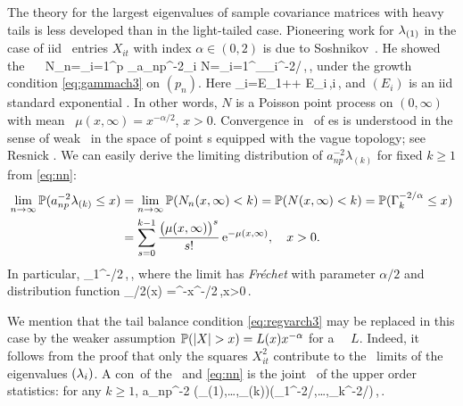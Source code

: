 The theory for the largest eigenvalues of sample covariance matrices with heavy tails is less developed than in the light-tailed case.
Pioneering work for $\lambda_{(1)}$ in the case of iid \regvary\ entries $X_{it}$ with index $\alpha\in (0,2)$
is due to Soshnikov~\cite{soshnikov:2004,soshnikov:2006}. He showed the \pp\ \con\
\beam\label{eq:nn}
N_n=\sum_{i=1}^p \vep_{a_{np}^{-2}\la_i} \std N=\sum_{i=1}^\infty \vep_{\Gamma_i^{-2/\alpha}}\,,\qquad \nto\,,
\eeam
under the growth condition \eqref{eq:gammach3} on $(p_n)$.
Here
\beam\label{eq:Gamma}
\Gamma_i=E_1+\cdots + E_i\,,\qquad i\,,
\eeam
and $(E_i)$ is an iid standard exponential \seq . In other words, $N$ is a Poisson point process on $(0,\infty)$ with mean \ms\
$\mu(x,\infty)= x^{-\alpha/2}$, $x>0$. Convergence in \ds\ of \pp es is understood in the sense of weak \con\
in the space of point \ms s equipped with the vague topology; see Resnick \cite{resnick:2007,resnick:1987}.
We can easily derive the limiting distribution of $a_{np}^{-2} \lambda_{(k)}$ for fixed $k\ge 1$ from \eqref{eq:nn}:
\begin{equation*}
\begin{split}
\lim_{n \to \infty}\mathbb{P}(a_{np}^{-2} \lambda_{(k)}\le x)&= \lim_{n \to \infty}\mathbb{P}(N_n(x,\infty)<k)
=  \mathbb{P}(N(x,\infty)<k) =\mathbb{P}(\Gamma_k^{-2/\alpha}\le x)\\ &= \sum_{s=0}^{k-1} \frac{\big(\mu(x,\infty)\big)^s}{s!} \operatorname{e}^{-\mu(x,\infty)}, \quad  x>0.
\end{split}
\end{equation*}
In particular,
\beao
{}\std \Gamma_1^{-\alpha/2}\,,\qquad \nto\,,
\eeao
where the limit has {\em Fr\'echet \ds } with parameter $\alpha/2$ and distribution function
\beao
\Phi_{\alpha/2}(x) =\ex^{-x^{-\alpha/2}}\,,\qquad x>0\,.
\eeao

\noindent We mention that the tail balance condition \eqref{eq:regvarch3} may be replaced in this case by the weaker assumption
$\P(|X|>x)= L(x) x^{-\alpha}$ for a \slvary\ \fct\ $L$. Indeed, it follows from the proof %
that only the squares $X_{it}^2$ contribute to the \pp\ limits of the eigenvalues $(\lambda_i)$. A con\seq\ of the
\cmt\ and \eqref{eq:nn} is the joint \con\ of the upper order statistics: for any $k\ge 1$,
\beao
a_{np}^{-2} \big(\la_{(1)},\ldots,\la_{(k)}\big)\std \big(\Gamma_1^{-2/\alpha},\ldots,\Gamma_k^{-2/\alpha}\big)\,,\qquad \nto\,.
\eeao


